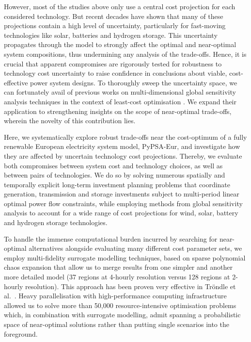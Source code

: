 However, most of the studies above only use a central cost projection for each
considered technology. But recent decades have shown that many of these
projections contain a high level of uncertainty, particularly for fast-moving
technologies like solar, batteries and hydrogen storage. This uncertainty
propagates through the model to strongly affect the optimal and near-optimal
system compositions, thus undermining any analysis of the trade-offs. Hence, it
is crucial that apparent compromises are rigorously tested for robustness to
technology cost uncertainty to raise confidence in conclusions about viable,
cost-effective power system designs. To thoroughly sweep the uncertainty space,
we can fortunately avail of previous works on multi-dimensional global
sensitivity analysis techniques in the context of least-cost optimisation
\cite{trondle_trade-offs_2020, mavromatidis_uncertainty_2018,
pizarro-alonso_uncertainties_2019, fais_impact_2016, usher_value_2015}. We
expand their application to strengthening insights on the scope of near-optimal
trade-offs, wherein the novelty of this contribution lies.


Here, we systematically explore robust trade-offs near the cost-optimum of a
fully renewable European electricity system model, PyPSA-Eur, and investigate
how they are affected by uncertain technology cost projections. Thereby, we
evaluate both compromises between system cost and technology choices, as well as
between pairs of technologies. We do so by solving numerous spatially and
temporally explicit long-term investment planning problems that coordinate
generation, transmission and storage investments subject to multi-period linear
optimal power flow constraints, while employing methods from global sensitivity
analysis to account for a wide range of cost projections for wind, solar,
battery and hydrogen storage technologies.


To handle the immense computational burden incurred by searching for
near-optimal alternatives alongside evaluating many different cost parameter
sets, we employ multi-fidelity surrogate modelling techniques, based on sparse
polynomial chaos expansion that allow us to merge results from one simpler and
another more detailed model (37 regions at 4-hourly resolution versus 128
regions at 2-hourly resolution). This approach has been proven very effective
in Tröndle et al.~\cite{trondle_trade-offs_2020}. Heavy parallelisation with
high-performance computing infrastructure allowed us to solve more than 50,000
resource-intensive optimisation problems which, in combination with surrogate
modelling, admit spanning a probabilistic space of near-optimal solutions rather
than putting single scenarios into the foreground.

